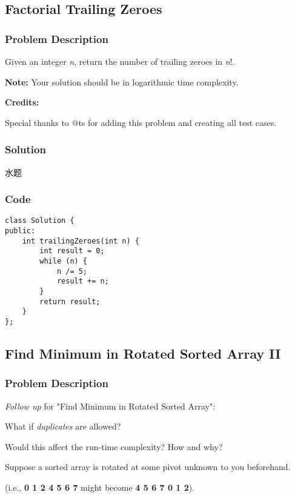 \documentclass[courier]{article}
\begin{document}
\begin{CJK*}{UTF8}{gkai}
\subsection{ Factorial Trailing Zeroes }

\subsubsection*{Problem Description}
Given an integer \emph{n}, return the number of trailing zeroes in \emph{n}!.

\textbf{Note: }Your solution should be in logarithmic time complexity.

\textbf{Credits:}

Special thanks to @ts for adding this problem and creating all test cases.



\subsubsection*{Solution}
水题

\subsubsection*{Code}
\begin{lstlisting}
class Solution {
public:
    int trailingZeroes(int n) {
        int result = 0;
        while (n) {
            n /= 5;
            result += n;
        }
        return result;
    }
}; 
\end{lstlisting}


\subsection{ Find Minimum in Rotated Sorted Array II }

\subsubsection*{Problem Description}
\emph{Follow up} for "Find Minimum in Rotated Sorted Array":


What if \emph{duplicates} are allowed?

Would this affect the run-time complexity? How and why?

Suppose a sorted array is rotated at some pivot unknown to you beforehand.

(i.e., \textbf{0 1 2 4 5 6 7} might become \textbf{4 5 6 7 0 1 2}).


\end{CJK*}
\end{document}
